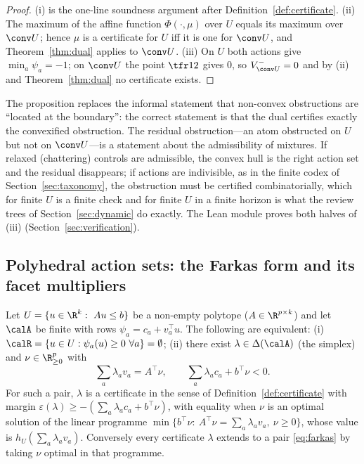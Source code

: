 \begin{proof}
(i) is the one-line soundness argument after Definition~\ref{def:certificate}. (ii) The maximum of the affine function $\Phi(\cdot,\mu)$ over $U$ equals its maximum over $\conv U$; hence $\mu$ is a certificate for $U$ iff it is one for $\conv U$, and Theorem~\ref{thm:dual} applies to $\conv U$. (iii) On $U$ both actions give $\min_a\psi_a=-1$; on $\conv U$ the point $\tfr12$ gives $0$, so $V^-_{\conv U}=0$ and by (ii) and Theorem~\ref{thm:dual} no certificate exists.
\end{proof}

The proposition replaces the informal statement that non-convex obstructions are ``located at the boundary'': the correct statement is that the dual certifies exactly the convexified obstruction. The residual obstruction---an atom obstructed on $U$ but not on $\conv U$---is a statement about the admissibility of mixtures. If relaxed (chattering) controls are admissible, the convex hull is the right action set and the residual disappears; if actions are indivisible, as in the finite codex of Section~\ref{sec:taxonomy}, the obstruction must be certified combinatorially, which for finite $U$ is a finite check and for finite $U$ in a finite horizon is what the review trees of Section~\ref{sec:dynamic} do exactly. The Lean module proves both halves of (iii) (Section~\ref{sec:verification}).

\subsection{Polyhedral action sets: the Farkas form and its facet multipliers}

\begin{theorem}\label{thm:polyhedral}
Let $U=\{u\in\R^k:\ Au\le b\}$ be a non-empty polytope ($A\in\R^{p\times k}$) and let $\calA$ be finite with rows $\psi_a=c_a+v_a^\top u$. The following are equivalent: (i) $\calR=\{u\in U:\psi_a(u)\ge0\ \forall a\}=\emptyset$; (ii) there exist $\lambda\in\Delta(\calA)$ (the simplex) and $\nu\in\R^p_{\ge0}$ with
\begin{equation}\label{eq:farkas}
\sum_a\lambda_av_a=A^\top\nu,\qquad \sum_a\lambda_ac_a+b^\top\nu<0 .
\end{equation}
For such a pair, $\lambda$ is a certificate in the sense of Definition~\ref{def:certificate} with margin $\varepsilon(\lambda)\ge-(\sum_a\lambda_ac_a+b^\top\nu)$, with equality when $\nu$ is an optimal solution of the linear programme $\min\{b^\top\nu:\ A^\top\nu=\sum_a\lambda_av_a,\ \nu\ge0\}$, whose value is $h_U(\sum_a\lambda_av_a)$. Conversely every certificate $\lambda$ extends to a pair \eqref{eq:farkas} by taking $\nu$ optimal in that programme.
\end{theorem}

